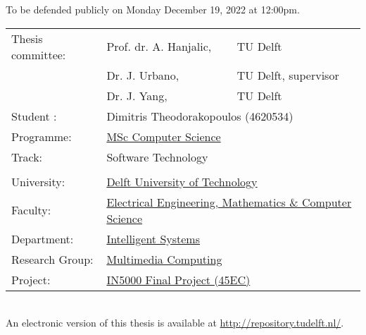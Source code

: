 \begin{titlepage}	
\begin{center}
	To be defended publicly on Monday December 19, 2022 at 12:00pm.\\[2cm]
	
	\begin{tabular}{lll}
		Thesis committee:   & Prof. dr. A. Hanjalic, & TU Delft\\
		& Dr. J. Urbano,    & TU Delft, supervisor\\
		& Dr. J. Yang,      & TU Delft\\[0.5cm]
		Student :           & \multicolumn{2}{l}{Dimitris Theodorakopoulos (4620534)}\\[1cm]
		Programme:          & \multicolumn{2}{l}{\href{https://www.tudelft.nl/onderwijs/opleidingen/masters/cs/msc-computer-science}{MSc Computer Science}}\\
		Track:              & \multicolumn{2}{l}{{Software Technology}}\\
		\\
		University:         & \multicolumn{2}{l}{\href{https://www.tudelft.nl/}{Delft University of Technology}}\\
		Faculty:            & \multicolumn{2}{l}{\href{https://www.tudelft.nl/en/eemcs}{Electrical Engineering, Mathematics \& Computer Science}}\\
		Department:         & \multicolumn{2}{l}{\href{https://www.tudelft.nl/en/eemcs/the-faculty/departments/intelligent-systems}{Intelligent Systems}}\\
		Research Group:     & \multicolumn{2}{l}{\href{https://www.tudelft.nl/en/ewi/over-de-faculteit/afdelingen/intelligent-systems/multimedia-computing}{Multimedia Computing}}\\
		Project:            & \multicolumn{2}{l}{\href{https://studiegids.tudelft.nl/a101_displayCourse.do?course_id=55295}{IN5000 Final Project (45EC)}}\\ 
	\end{tabular}\\[2cm]
	
	An electronic version of this thesis is available at \url{http://repository.tudelft.nl/}.
\end{center}
\end{titlepage}